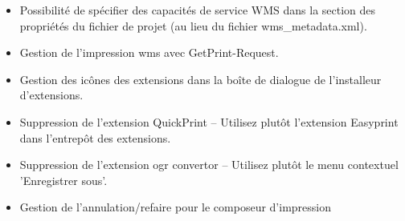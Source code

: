 
\begin{itemize}[label=--]
\item Possibilité de spécifier des capacités de service WMS dans la section des propriétés du fichier de projet (au lieu du fichier wms\_metadata.xml). 
\item Gestion de l'impression wms avec GetPrint-Request. 
\end{itemize}


\begin{itemize}[label=--]
\item Gestion des icônes des extensions dans la boîte de dialogue de l'installeur 
d'extensions. 
\item Suppression de l'extension QuickPrint – Utilisez plutôt l'extension Easyprint dans l'entrepôt des extensions.
\item Suppression de l'extension ogr convertor – Utilisez plutôt le menu 
contextuel 'Enregistrer sous'.
\end{itemize}


\begin{itemize}[label=--]
\item Gestion de l'annulation/refaire pour le composeur d'impression
\end{itemize}

\newpage


